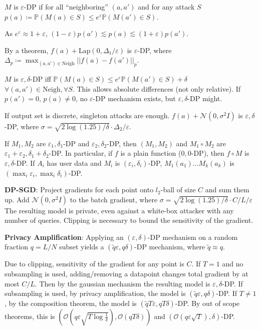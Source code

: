 \documentclass[11pt,landscape,a4paper,fleqn]{article}
\newcommand{\mhl}[1]{#1}
\begin{document}
\begin{multicols*}{4}
\({M}\) is \(\varepsilon\)-DP if for all ``neighboring'' \((a, a')\)
and for any attack \(S\)
\mhl{\(p(a) \coloneqq \mathbb{P}({M}(a) \in S) \leq e^\varepsilon \mathbb{P}({M}(a') \in S)\)}.

As \(e^{\varepsilon} \approx 1 + \varepsilon\),
\((1 - \varepsilon) p(a') \lesssim p(a) \lesssim (1 + \varepsilon) p(a')\).

By a theorem, \mhl{\(f(a) + \mathrm{Lap}(0, \Delta_1 / \varepsilon)\)} is \(\varepsilon\)-DP,
where \(\Delta_p \coloneqq \max_{(a, a') \in \mathrm{Neigh}} ||f(a) - f(a')||_p\).

\(M\) is \(\varepsilon, \delta\)-DP iff 
\mhl{\(\mathbb{P}(M(a) \in S) \leq e^{\varepsilon} \mathbb{P}(M(a') \in S) + \delta\)}
\(\forall (a, a') \in \mathrm{Neigh}, \forall S\). This allows absolute differences (not only relative).
If \(p(a') = 0\), \(p(a) \neq 0\), no \(\varepsilon\)-DP mechanism exists, but \(\varepsilon, \delta\)-DP might.

If output set is discrete, singleton attacks are enough.
\mhl{\(f(a) + \mathcal{N}(0, \sigma^2 I)\)} is \(\varepsilon, \delta\)-DP,
where \mhl{\(\sigma = \sqrt{2 \log(1.25) / \delta} \cdot \Delta_2 / \varepsilon\)}.

If \(M_1, M_2\) are \(\varepsilon_1, \delta_1\)-DP and \(\varepsilon_2, \delta_2\)-DP,
then \((M_1, M_2)\) and \(M_1 \circ M_2\) are \(\varepsilon_1 + \varepsilon_2, \delta_1 + \delta_2\)-DP.
In particular, if \(f\) is a plain function (\(0, 0\)-DP), then \(f \circ M\) is \(\varepsilon, \delta\)-DP.
If \(A_i\) has user data and \(M_i\) is \((\varepsilon_i, \delta_i)\)-DP, \(M_1(a_1) \dots M_k(a_k)\) is \((\max_i \varepsilon_i, \max_i \delta_i)\)-DP.

\textbf{DP-SGD}: Project gradients for each point onto \(l_2\)-ball of size \(C\) and sum them up.
Add \(\mathcal{N}(0, \sigma^2 I)\) to the batch gradient, where 
\mhl{\(\sigma = \sqrt{2 \log(1.25) / \delta} \cdot C / L / \varepsilon\)}
The resulting model is private, even against a white-box attacker with any number of queries.
Clipping is necessary to bound the sensitivity of the gradient.

\textbf{Privacy Amplification}: Applying an \((\varepsilon, \delta)\)-DP mechanism on a random fraction
\(q = L / N\) subset yields a \((\tilde{q}\varepsilon, q\delta)\)-DP mechanism, where \(\tilde{q} \approx q\).

Due to clipping, sensitivity of the gradient for any point is \(C\).
If \(T = 1\) and no subsampling is used, adding/removing a datapoint changes total gradient by at most \(C / L\).
Then by the gaussian mechanism the resulting model is \(\varepsilon, \delta\)-DP.
If subsampling is used, by privacy amplification, the model is \((\tilde{q}\varepsilon, q\delta)\)-DP.
If \(T \neq 1\), by the composition theorem, the model is \((\tilde{q} T \varepsilon, q T \delta)\)-DP.
By out of scope theorems, this is
\((\mathcal{O}(q \varepsilon \sqrt{T \log \frac{1}{\delta}}), \mathcal{O}(qT\delta))\) and
\((\mathcal{O}(q\varepsilon \sqrt{T}), \delta)\)-DP.


\end{multicols*}
\end{document}
